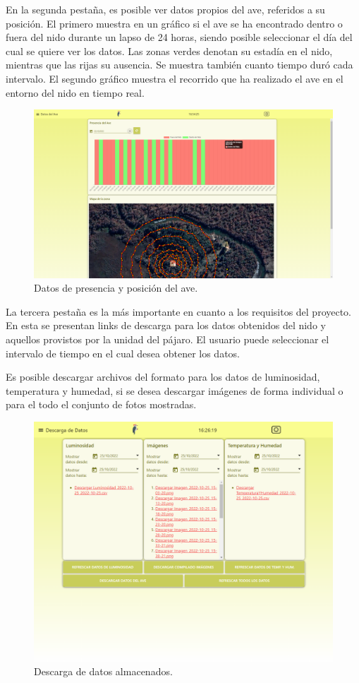 En la segunda pestaña, es posible ver datos propios del ave, referidos a su posición. El primero muestra en un gráfico si el ave se ha encontrado dentro o fuera del nido durante un lapso de 24 horas, siendo posible seleccionar el día del cual se quiere ver los datos. Las zonas verdes denotan su estadía en el nido, mientras que las rijas su ausencia. Se muestra también cuanto tiempo duró cada intervalo. El segundo gráfico muestra el recorrido que ha realizado el ave en el entorno del nido en tiempo real.
\begin{figure}[H]
	\centering
    \includegraphics[width=0.7\linewidth]{ImagenesIngenieria de Detalle/Node-Red-Bird-Data}	
	\caption{Datos de presencia y posición del ave.}
	\label{fig:node_red_bird}
\end{figure}

La tercera pestaña es la más importante en cuanto a los requisitos del proyecto. En esta se presentan links de descarga para los datos obtenidos del nido y aquellos provistos por la unidad del pájaro. El usuario puede seleccionar el intervalo de tiempo en el cual desea obtener los datos.

Es posible descargar archivos del formato  para los datos de luminosidad, temperatura y humedad,  si se desea descargar imágenes de forma individual o  para el todo el conjunto de fotos mostradas.
\begin{figure}[H]
	\centering
    \includegraphics[width=0.7\linewidth]{ImagenesIngenieria de Detalle/Node-Red-Download}	
	\caption{Descarga de datos almacenados.}
	\label{fig:node_red_download}
\end{figure}

